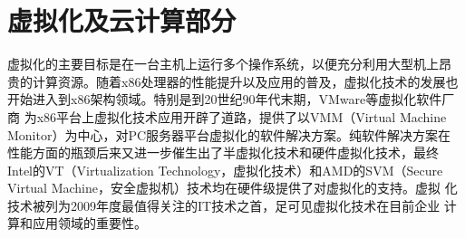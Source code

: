 \part{虚拟化及云计算部分}
\label{part:virtualization}

虚拟化的主要目标是在一台主机上运行多个操作系统，以便充分利用大型机上昂
贵的计算资源。随着x86处理器的性能提升以及应用的普及，虚拟化技术的发展也
开始进入到x86架构领域。特别是到20世纪90年代末期，VMware等虚拟化软件厂商
为x86平台上虚拟化技术应用开辟了道路，提供了以VMM（Virtual Machine
  Monitor）为中心，对PC服务器平台虚拟化的软件解决方案。纯软件解决方案在
性能方面的瓶颈后来又进一步催生出了半虚拟化技术和硬件虚拟化技术，最终
Intel的VT（Virtualization Technology，虚拟化技术）和AMD的SVM（Secure
  Virtual Machine，安全虚拟机）技术均在硬件级提供了对虚拟化的支持。虚拟
化技术被列为2009年度最值得关注的IT技术之首，足可见虚拟化技术在目前企业
计算和应用领域的重要性。







